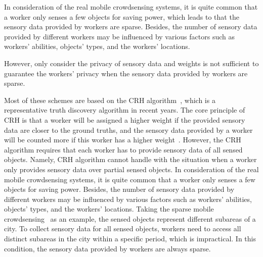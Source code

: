 \documentclass[conference]{IEEEtran}
\begin{document}

In consideration of the real mobile crowdsensing systems, it is quite common that a worker only senses a few objects for saving power, which leads to that the sensory data provided by workers are sparse.
Besides, the number of sensory data provided by different workers may be influenced by various factors such as workers' abilities, objects' types, and the workers' locations.

However, only consider the privacy of sensory data and weights is not sufficient to guarantee the workers' privacy when the sensory data provided by workers are sparse.

Most of these schemes are based on the CRH algorithm~\cite{li_resolving_2014}, which is a representative truth discovery algorithm in recent years.
The core principle of CRH is that a worker will be assigned a higher weight if the provided sensory data are closer to the ground truths, and the sensory data provided by a worker will be counted more if this worker has a higher weight~\cite{xu_efficient_2019}.
However, the CRH algorithm requires that each worker has to provide sensory data of all sensed objects.
Namely, CRH algorithm cannot handle with the situation when a worker only provides sensory data over partial sensed objects.
In consideration of the real mobile crowdsensing systems, it is quite common that a worker only senses a few objects for saving power.
Besides, the number of sensory data provided by different workers may be influenced by various factors such as workers' abilities, objects' types, and the workers' locations.
Taking the sparse mobile crowdsensing~\cite{wang_sparse_2016} as an example, the sensed objects represent different subareas of a city.
To collect sensory data for all sensed objects, workers need to access all distinct subareas in the city within a specific period, which is impractical.
In this condition, the sensory data provided by workers are always sparse.
\end{document}
